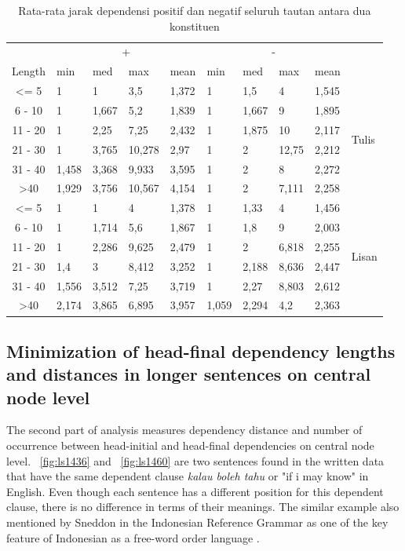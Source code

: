 \documentclass[10pt, a4paper, conference, compsocconf]{IEEEtran}
\begin{document}
\begin{table}
\begin{center}
\tiny
\caption{Rata-rata jarak dependensi positif dan negatif seluruh tautan antara dua konstituen}  \label{tab:deskriptif-mdd}
\begin{tabular}{c l l l l l l l l l}
\hline
 & \multicolumn{4}{c}{+} & \multicolumn{4}{c}{-} & \\  \cline{2-9}  
Length & min 	& med	& max 	& mean 	& min 	& med 	& max 	& mean 	& \\ \cline{1-10}  
\textless= 5 	& 1 		& 1 		& 3,5	 	& 1,372 	& 1 		& 1,5 	& 4	 	& 1,545 	&\multirow{6}{*}{Tulis}\\
6 - 10 		& 1 		& 1,667	& 5,2 	& 1,839 	& 1 		& 1,667 	& 9	 	& 1,895 	& 	\\
11 - 20 		& 1 		& 2,25 	& 7,25 	& 2,432 	& 1 		& 1,875 	& 10	 	& 2,117 	& 	\\
21 - 30 		& 1 		& 3,765 	& 10,278 	& 2,97 	& 1 		& 2 		& 12,75	& 2,212 	& 	\\ 
31 - 40 		& 1,458 	& 3,368 	& 9,933	& 3,595 	& 1 		& 2 		& 8		& 2,272 	& 	\\
\textgreater 40 	& 1,929 	& 3,756	& 10,567 	& 4,154 	& 1 		& 2 		& 7,111	& 2,258 	& 	\\ 
\hline
\textless= 5 	& 1 		& 1 		& 4	 	& 1,378 	& 1 		& 1,33 	& 4		& 1,456 	& \multirow{6}{*}{Lisan}\\
6 - 10 		& 1 		& 1,714	& 5,6 	& 1,867 	& 1 		& 1,8		& 9		& 2,003 	& \\
11 - 20 		& 1 		& 2,286 	& 9,625 	& 2,479 	& 1 		& 2 		& 6,818	& 2,255 	& \\
21 - 30 		& 1,4 	& 3	 	& 8,412 	& 3,252	& 1 		& 2,188	& 8,636	& 2,447 	& \\ 
31 - 40 		& 1,556 	& 3,512 	& 7,25	& 3,719 	& 1 		& 2,27	& 8,803	& 2,612 	& \\
\textgreater 40 	& 2,174 	& 3,865	& 6,895 	& 3,957 	& 1,059 	& 2,294	& 4,2		& 2,363 	& \\ 
\hline
   \end{tabular}
\end{center}
\end{table}

\subsection{Minimization of head-final dependency lengths and distances in longer sentences on central node level}
The second part of analysis measures dependency distance and number of occurrence between head-initial and head-final dependencies on central node level. \pic~\ref{fig:ls1436} and \pic~\ref{fig:ls1460} are two sentences found in the written data that have the same dependent clause \textit{kalau boleh tahu} or "if i may know" in English. Even though each sentence has a different position for this dependent clause, there is no difference in terms of their meanings. The similar example also mentioned by Sneddon in the Indonesian Reference Grammar as one of the key feature of Indonesian as a free-word order language \cite{sneddon2010indonesian}.
\end{document}
